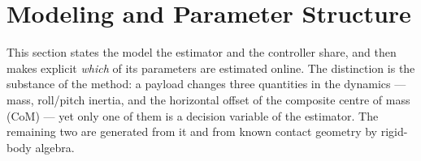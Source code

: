 
\providecommand{\dJ}{\Delta J}
\providecommand{\Jt}{J_t}                  %
\providecommand{\Jb}{J_b}                  %
\providecommand{\cvec}{\mathbf{c}}
\providecommand{\rp}{\mathbf{r}_p}
\providecommand{\rc}{\mathbf{r}_c}
\providecommand{\mpay}{\hat{m}_p}          %
\providecommand{\mb}{m_b}                  %
\providecommand{\mt}{m_t}                  %
\providecommand{\Tphys}{T_{\mathrm{phys}}}
\providecommand{\tauphys}{\boldsymbol{\tau}_{\mathrm{phys}}}
\providecommand{\tcom}{\boldsymbol{\tau}_{\mathrm{com}}}
\providecommand{\ev}{\mathbf{e}_3}

\section{Modeling and Parameter Structure}\label{sec:model}

This section states the model the estimator and the controller share, and
then makes explicit \emph{which} of its parameters are estimated online.
The distinction is the substance of the method: a payload changes three
quantities in the dynamics --- mass, roll/pitch inertia, and the
horizontal offset of the composite centre of mass (CoM) --- yet only one
of them is a decision variable of the estimator. The remaining two are
generated from it and from known contact geometry by rigid-body algebra.

